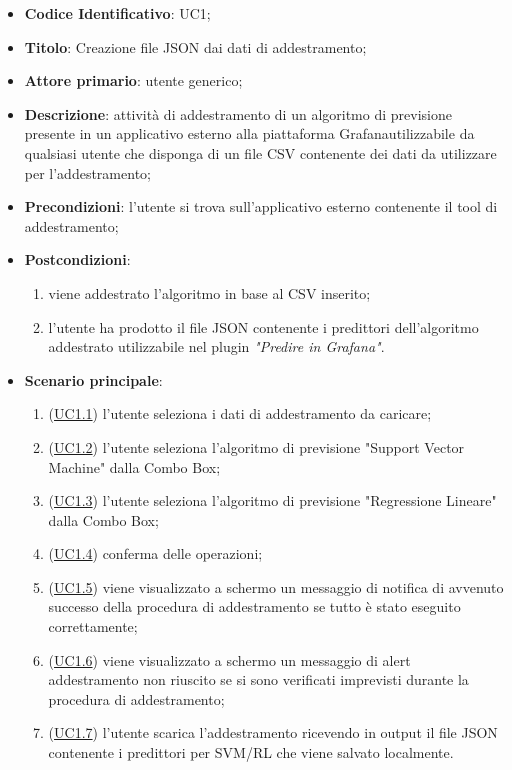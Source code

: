 		\begin{itemize}
			\item\textbf{Codice Identificativo}: UC1;
			\item\textbf{Titolo}: Creazione file JSON dai dati di addestramento;
			\item\textbf{Attore primario}: utente generico;
			\item\textbf{Descrizione}: attività di addestramento di un algoritmo di previsione presente in un applicativo esterno alla piattaforma Grafana\glo utilizzabile da qualsiasi utente che disponga di un file CSV contenente dei dati da utilizzare per l'addestramento;
			\item\textbf{Precondizioni}: l'utente si trova sull'applicativo esterno contenente il tool di addestramento;
			\item\textbf{Postcondizioni}:
				\begin{enumerate}
					\item viene addestrato l'algoritmo in base al CSV inserito;
					\item l'utente ha prodotto il file JSON contenente i predittori dell'algoritmo addestrato utilizzabile nel plugin \textit{"Predire in Grafana"}.
				\end{enumerate}
			\item\textbf{Scenario principale}:
				\begin{enumerate}
					\item (\hyperref[par:UC1.1]{UC1.1}) l'utente seleziona i dati di addestramento da caricare;
					\item (\hyperref[par:UC1.2]{UC1.2}) l'utente seleziona l'algoritmo di previsione "Support Vector Machine" dalla Combo Box\glo;
					\item (\hyperref[par:UC1.3]{UC1.3}) l'utente seleziona l'algoritmo di previsione "Regressione Lineare" dalla Combo Box\glo;
					\item (\hyperref[par:UC1.4]{UC1.4}) conferma delle operazioni;
					\item (\hyperref[par:UC1.5]{UC1.5}) viene visualizzato a schermo un messaggio di notifica di avvenuto successo della procedura di addestramento se tutto è stato eseguito correttamente;
					\item (\hyperref[par:UC1.6]{UC1.6}) viene visualizzato a schermo un messaggio di alert addestramento non riuscito se si sono verificati imprevisti durante la procedura di addestramento;
					\item (\hyperref[par:UC1.7]{UC1.7}) l'utente scarica l'addestramento ricevendo in output il file JSON contenente i predittori per SVM/RL che viene salvato localmente.

\end{enumerate}
\end{itemize}
